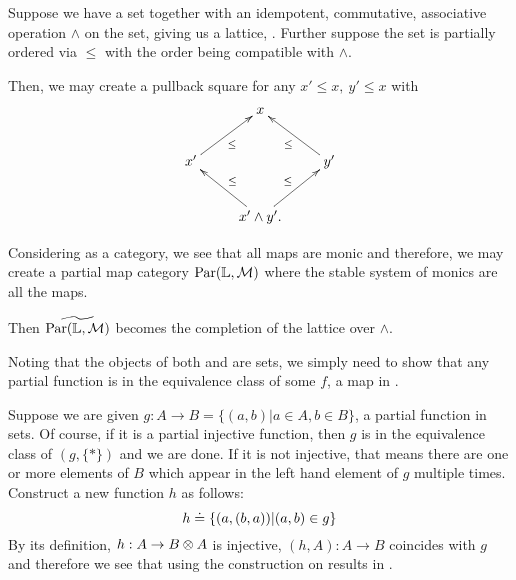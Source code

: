 \begin{example}\label{example:lattice_completion}
  Suppose we have a set together with an idempotent, commutative, associative operation $\wedge$ on
  the set, giving us a lattice, \Lat. Further suppose the set is partially ordered via $\le$ with
  the order being compatible with $\wedge$.

  Then, we may create a pullback square for any $x' \le x,\ y' \le x$ with
  \[
    \xymatrix{
      &x\\
      x' \ar[ur]_{\le} & & y' \ar[ul]^{\le}\\
      &x'\wedge y'.  \ar[ul]_{\le} \ar[ur]^{\le}
    }
  \]

  Considering \Lat as a category, we see that all maps are monic and therefore, we may create a
  partial map category $\text{Par}(\mathbb{L},\mathcal{M})$ where the stable system of monics are all the maps.

  Then $\widetilde{\text{Par}(\mathbb{L},\mathcal{M})}$ becomes the completion of the lattice over $\wedge$.
\end{example}
\begin{example}\label{ex:tilde_pinj_is_par}
  Noting that the objects of both \pinj and \Par are sets, we simply need to show that any partial
  function is in the equivalence class of some $f$, a map in \pinj.

  Suppose we are given $g : A \to B = \{(a,b) | a \in A, b\in B\}$, a partial function in sets. Of
  course, if it is a partial injective function, then $g$ is in the equivalence class of $(g,\{*\})$
  and we are done.  If it is not injective, that means there are one or more elements of $B$ which
  appear in the left hand element of $g$ multiple times. Construct a new function $h$ as follows:
  \begin{equation}
     h \doteq \{(a,(b,a)) | (a,b) \in g\} \label{eq:new_partial_injective}
  \end{equation}
  By its definition, $h : A \to B \otimes A$ is injective, $(h,A): A \to B$ coincides with $g$ and therefore
  we see that using the \wtc construction on \pinj results in \Par.
\end{example}



